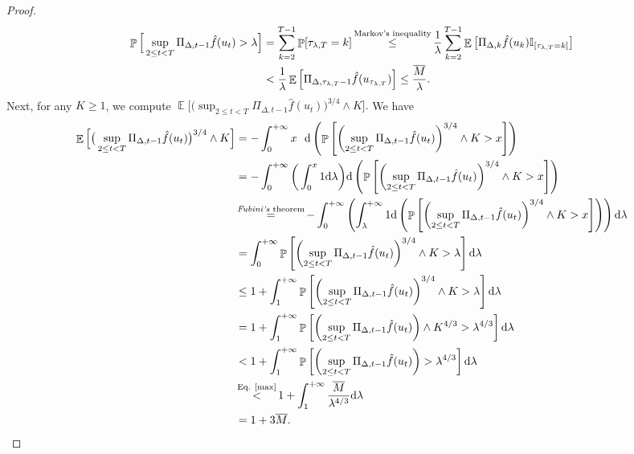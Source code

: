 \documentclass{article} %
\DeclareMathOperator{\Expect}{\mathbb{E}}
\newcommand{\I}{\mathbb{I}}
\DeclareMathOperator{\Pro}{\mathbb{P}}
\begin{document}
\begin{proof}
\begin{align}\label{max}
\Pro\Big[\sup_{2\le t<T}\Pi_{\Delta,t-1}\hat{f}(u_{t})>\lambda\Big]&=\sum_{k=2}^{T-1}\Pro[\tau_{\lambda,T}=k]\mathop{\le}^{\text{Markov's inequality}}\frac{1}{\lambda}\sum_{k=2}^{T-1}\Expect\big[\Pi_{\Delta,k}\hat{f}(u_{k})\I_{[\tau_{\lambda,T}=k]}\big]\notag\\&<\frac{1}{\lambda}\Expect\Big[\Pi_{\Delta,\tau_{\lambda,T}-1}\hat{f}(u_{\tau_{\lambda,T}})\Big]\le \frac{\overline{M}}{\lambda}.
\end{align}
Next, for any $K \geq 1$, we compute $\Expect\Big[\big(\sup_{2\le t<T}\Pi_{\Delta,t-1}\hat{f}(u_{t})\big)^{3/4} \wedge K\Big].$ We have
\begin{align*}
 \Expect\Big[\big(\sup_{2\le t<T}\Pi_{\Delta,t-1}\hat{f}(u_{t})\big)^{3/4} \wedge K\Big]&=-\int_{0}^{+\infty}x\ \ \text{d}\left(\Pro\left[\left(\sup_{2\le t<T}\Pi_{\Delta,t-1}\hat{f}(u_{t})\right)^{3/4} \wedge K>x\right]\right)\\&=-\int_{0}^{+\infty}\bigg(\int_{0}^{x}1\text{d}\lambda\bigg)\text{d}\left(\Pro\left[\left(\sup_{2\le t<T}\Pi_{\Delta,t-1}\hat{f}(u_{t})\right)^{3/4} \wedge K>x\right]\right)\\&\mathop{=}^{\text{\emph{Fubini's} theorem}}-\int_{0}^{+\infty}\left(\int_{\lambda}^{+\infty}1\text{d}\left(\Pro\left[\left(\sup_{2\le t<T}\Pi_{\Delta,t-1}\hat{f}(u_{t})\right)^{3/4} \wedge K>x\right]\right)\right)\text{d}\lambda\\&=\int_{0}^{+\infty}\Pro\left[\left(\sup_{2\le t<T}\Pi_{\Delta,t-1}\hat{f}(u_{t})\right)^{3/4} \wedge K>\lambda\right]\text{d}\lambda\\&\le 1+\int_{1}^{+\infty}\Pro\left[\left(\sup_{2\le t<T}\Pi_{\Delta,t-1}\hat{f}(u_{t})\right)^{3/4} \wedge K>\lambda\right]\text{d}\lambda\\&=1+\int_{1}^{+\infty}\Pro\left[\left(\sup_{2\le t<T}\Pi_{\Delta,t-1}\hat{f}(u_{t})\right) \wedge K^{4/3}>\lambda^{4/3}\right]\text{d}\lambda\\&<1+\int_{1}^{+\infty}\Pro\left[\left(\sup_{2\le t<T}\Pi_{\Delta,t-1}\hat{f}(u_{t})\right)>\lambda^{4/3}\right]\text{d}\lambda\\&\mathop{<}^{\text{Eq. \ref{max}}}1+\int_{1}^{+\infty}\frac{\overline{M}}{\lambda^{4/3}}\text{d}\lambda\\&=1+3\overline{M}.

\end{align*}
\end{proof}
\end{document}
